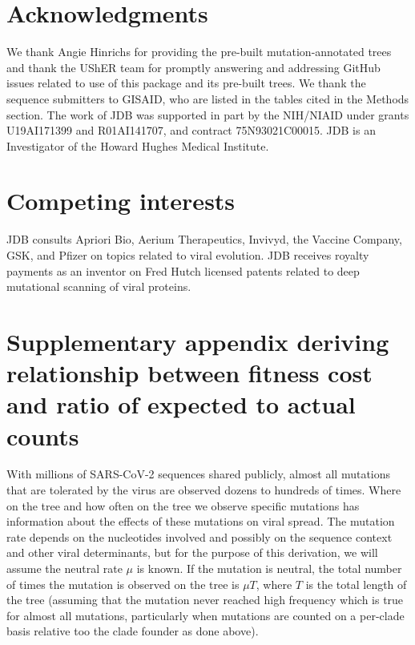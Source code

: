 \documentclass[9pt,twocolumn,twoside]{gsajnl_modified}
\begin{document}
{\section{Acknowledgments}
We thank Angie Hinrichs for providing the pre-built mutation-annotated trees and thank the UShER team for promptly answering and addressing GitHub issues related to use of this package and its pre-built trees.
We thank the sequence submitters to GISAID, who are listed in the tables cited in the Methods section.
The work of JDB was supported in part by the NIH/NIAID under grants U19AI171399 and R01AI141707, and contract 75N93021C00015.
JDB is an Investigator of the Howard Hughes Medical Institute.

\section{Competing interests}
JDB consults Apriori Bio, Aerium Therapeutics, Invivyd, the Vaccine Company, GSK, and Pfizer on topics related to viral evolution.
JDB receives royalty payments as an inventor on Fred Hutch licensed patents related to deep mutational scanning of viral proteins.


}

\onecolumn
\renewcommand{\thepage}{S\arabic{page}}
\setcounter{page}{1}
\renewcommand{\thefigure}{S\arabic{figure}}
\setcounter{figure}{0}

\clearpage

\section{Supplementary appendix deriving relationship between fitness cost and ratio of expected to actual counts}

With millions of SARS-CoV-2 sequences shared publicly, almost all mutations that are tolerated by the virus are observed dozens to hundreds of times.
Where on the tree and how often on the tree we observe specific mutations has information about the effects of these mutations on viral spread.
The mutation rate depends on the nucleotides involved and possibly on the sequence context and other viral determinants, but for the purpose of this derivation, we will assume the neutral rate $\mu$ is known.
If the mutation is neutral, the total number of times the mutation is observed on the tree is $\mu T$, where $T$ is the total length of the tree (assuming that the mutation never reached high frequency which is true for almost all mutations, particularly when mutations are counted on a per-clade basis relative too the clade founder as done above).
\end{document}
